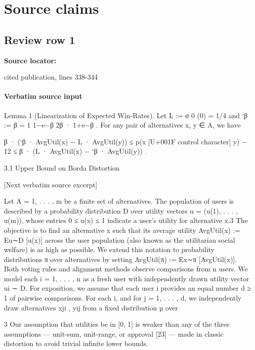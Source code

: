 \documentclass[10pt]{article}
\begin{document}
\clearpage
\hypertarget{source-claim-979ce61abfc9e53f}{}
\hypertarget{source-section-f10b5f68e4acf3dc}{}
\section*{Source claims}
\subsection*{Review row 1}
\textbf{Source locator:} {\footnotesize\raggedright cited publication, lines 338-\allowbreak{}344\par}
\paragraph{Verbatim source input}
\begin{ReviewVerbatim}
Lemma 1 (Linearization of Expected Win-Rates). Let L := σ 0 (0) = 1/4 and `β :=                β       =
 1   1−e−β
2β · 1+e−β . For any pair of alternatives x, y ∈ A, we have

β · (`β · AvgUtil(x) − L · AvgUtil(y)) ≤ p(x [U+001F control character] y) − 12 ≤ β · (L · AvgUtil(x) − `β · AvgUtil(y)) .

3.1   Upper Bound on Borda Distortion

[Next verbatim source excerpt]

Let A = {1, . . . , m} be a finite set of alternatives. The population of users is described by a
probability distribution D over utility vectors u = (u(1), . . . , u(m)), whose entries 0 ≤ u(x) ≤ 1
indicate a user’s utility for alternative x.3 The objective is to find an alternative x such that its average
utility AvgUtil(x) := Eu∼D [u(x)] across the user population (also known as the utilitarian social
welfare) is as high as possible. We extend this notation to probability distributions π over alternatives
by setting AvgUtil(π) := Ex∼π [AvgUtil(x)].
Both voting rules and alignment methods observe comparisons from n users. We model each
i = 1, . . . , n as a fresh user with independently drawn utility vector ui ∼ D. For exposition, we
assume that each user i provides an equal number d ≥ 1 of pairwise comparisons. For each i,
and for j = 1, . . . , d, we independently draw alternatives xji , yij from a fixed distribution µ over

    3
     Our assumption that utilities be in [0, 1] is weaker than any of the three assumptions — unit-sum, unit-range,
or approval [23] — made in classic distortion to avoid trivial infinite lower bounds.



\end{ReviewVerbatim}
\end{document}
